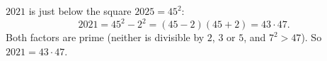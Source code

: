 $2021$ is just below the square $2025=45^2$:
\[2021=45^2-2^2=(45-2)(45+2)=43\cdot47.\]
Both factors are prime (neither is divisible by $2$, $3$ or $5$, and $7^2>47$). So $2021=\boxed{43\cdot47}$.
